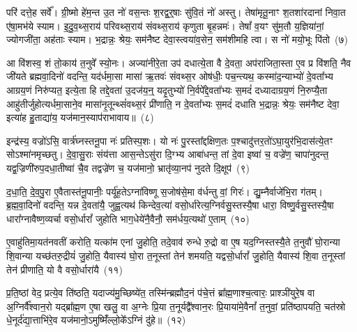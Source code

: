 परि॑ दत्ते॒ह सर्वे᳚। ग्री॒ष्मो हे॑म॒न्त उ॒त नो॑ वस॒न्तः श॒रद्व॒र्॒\mbox{}षाः सु॑वि॒तं नो॑ अस्तु। तेषा॑मृतू॒नाꣳ श॒तशा॑रदानां निवा॒त ए॑षा॒मभ॑ये स्याम। इ॒दु॒व॒थ्स॒राय॑ परिवथ्स॒राय॑ संवथ्स॒राय॑ कृणुता बृ॒हन्नमः॑। तेषां᳚ व॒यꣳ सु॑म॒तौ य॒ज्ञिया॑नां॒ ज्योगजी॑ता॒ अह॑ताः स्याम। भ॒द्रान्नः॒ श्रेयः॒ सम॑नैष्ट देवा॒स्त्वया॑व॒सेन॒ सम॑शीमहि त्वा। स नो॑ मयो॒भूः पि॑तो~(७)\ip

आ वि॑शस्व॒ शं तो॒काय॑ त॒नुवे᳚ स्यो॒नः। अज्या॑नीरे॒ता उप॑ दधात्ये॒ता वै दे॒वता॒ अप॑राजिता॒स्ता ए॒व प्र वि॑शति॒ नैव जी॑यते ब्रह्मवा॒दिनो॑ वदन्ति॒ यद॑र्धमा॒सा मासा॑ ऋ॒तवः॑ संवथ्स॒र ओष॑धीः॒ पच॒न्त्यथ॒ कस्मा॑द॒न्याभ्यो॑ दे॒वता᳚भ्य आग्रय॒णं निरु॑प्यत॒ इत्ये॒ता हि तद्दे॒वता॑ उ॒दज॑य॒न्॒ यदृ॒तुभ्यो॑ नि॒र्वपे᳚द्दे॒वता᳚भ्यः स॒मदं॑ दध्यादाग्रय॒णं नि॒रुप्यै॒ता आहु॑तीर्जुहोत्यर्धमा॒साने॒व मासा॑नृ॒तून्थ्सं॑वथ्स॒रं प्री॑णाति॒ न दे॒वता᳚भ्यः स॒मदं॑ दधाति भ॒द्रान्नः॒ श्रेयः॒ सम॑नैष्ट देवा॒ इत्या॑ह हु॒ताद्या॑य॒ यज॑मान॒स्याप॑राभावाय॥~(८)\ip

{\anuvakamend[{प्रा॒जा॒प॒त्यां लो॒काय॑ देवाः पितो दध्यादाग्रय॒णं पञ्च॑विꣳशतिश्च}]}

इन्द्र॑स्य॒ वज्रो॑\-ऽसि॒ वार्त्र॑घ्नस्तनू॒पा नः॑ प्रतिस्प॒शः। यो नः॑ पु॒रस्ता᳚द्दक्षिण॒तः प॒श्चादु॑त्तर॒तो॑\-ऽघा॒युर॑भि॒दास॑त्ये॒तꣳ सो\-ऽश्मा॑नमृच्छतु। दे॒वा॒सु॒राः संय॑त्ता आस॒न्ते\-ऽसु॑रा दि॒ग्भ्य आबा॑धन्त॒ तां दे॒वा इष्वा॑ च॒ वज्रे॑ण॒ चापा॑नुदन्त॒ यद्व॒ज्रिणी॑रुप॒दधा॒तीष्वा॑ चै॒व तद्वज्रे॑ण च॒ यज॑मानो॒ भ्रातृ॑व्या॒नप॑ नुदते दि॒क्षूप॑~(९)\ip

द॒धा॒ति॒ दे॒व॒पु॒रा ए॒वैतास्त॑नू॒पानीः॒ पर्यू॑ह॒ते\-ऽग्ना॑विष्णू स॒जोष॑से॒मा व॑र्धन्तु वां॒ गिरः॑। द्यु॒म्नैर्वाजे॑भि॒रा ग॑तम्। ब्र॒ह्म॒वा॒दिनो॑ वदन्ति॒ यन्न दे॒वता॑यै॒ जुह्व॒त्यथ॑ किन्देव॒त्या॑ वसो॒र्धारेत्य॒ग्निर्वसु॒स्तस्यै॒षा धारा॒ विष्णु॒र्वसु॒स्तस्यै॒षा धारा᳚ग्नावैष्ण॒व्यर्चा वसो॒र्धारां᳚ जुहोति भाग॒धेये॑नै॒वैनौ॒ सम॑र्धय॒त्यथो॑ ए॒ताम्~(१०)\ip

ए॒वाहु॑तिमा॒यत॑नवतीं करोति॒ यत्का॑म एनां जु॒होति॒ तदे॒वाव॑ रुन्धे रु॒द्रो वा ए॒ष यद॒ग्निस्तस्यै॒ते त॒नुवौ॑ घो॒रान्या शि॒वान्या यच्छ॑तरु॒द्रीयं॑ जु॒होति॒ यैवास्य॑ घो॒रा त॒नूस्तां तेन॑ शमयति॒ यद्वसो॒र्धारां᳚ जु॒होति॒ यैवास्य॑ शि॒वा त॒नूस्तां तेन॑ प्रीणाति॒ यो वै वसो॒र्धारा॑यै~(११)\ip

प्र॒ति॒ष्ठां वेद॒ प्रत्ये॒व ति॑ष्ठति॒ यदाज्य॑मु॒च्छिष्ये॑त॒ तस्मि॑न्ब्रह्मौद॒नं प॑चे॒त्तं ब्रा᳚ह्म॒णाश्च॒त्वारः॒ प्राश्ञी॑युरे॒ष वा अ॒ग्निर्वै᳚श्वान॒रो यद्ब्रा᳚ह्म॒ण ए॒षा खलु॒ वा अ॒ग्नेः प्रि॒या त॒नूर्यद्वै᳚श्वान॒रः प्रि॒याया॑मे॒वैनां᳚ त॒नुवां॒ प्रति॑\-ष्ठापयति॒ चत॑स्रो धे॒नूर्द॑द्या॒त्ताभि॑रे॒व यज॑मानो॒\-ऽमुष्मिँ॑ल्लो॒के᳚\-ऽग्निं दु॑हे॥~(१२)\ip

